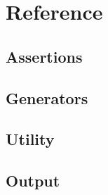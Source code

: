 \section{Reference}

\subsection{Assertions}

\subsection{Generators}

\subsection{Utility}

\subsection{Output}
